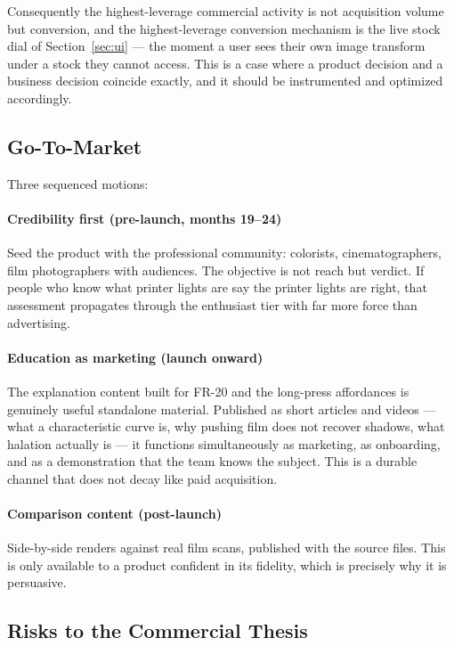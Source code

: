Consequently the highest-leverage commercial activity is not acquisition volume
but conversion, and the highest-leverage conversion mechanism is the live stock
dial of Section~\ref{sec:ui} --- the moment a user sees their own image
transform under a stock they cannot access. This is a case where a product
decision and a business decision coincide exactly, and it should be instrumented
and optimized accordingly.

\subsection{Go-To-Market}

Three sequenced motions:

\paragraph{Credibility first (pre-launch, months 19--24)} Seed the product with
the professional community: colorists, cinematographers, film photographers with
audiences. The objective is not reach but verdict. If people who know what
printer lights are say the printer lights are right, that assessment propagates
through the enthusiast tier with far more force than advertising.

\paragraph{Education as marketing (launch onward)} The explanation content built
for FR-20 and the long-press affordances is genuinely useful standalone material.
Published as short articles and videos --- what a characteristic curve is, why
pushing film does not recover shadows, what halation actually is --- it
functions simultaneously as marketing, as onboarding, and as a demonstration
that the team knows the subject. This is a durable channel that does not decay
like paid acquisition.

\paragraph{Comparison content (post-launch)} Side-by-side renders against real
film scans, published with the source files. This is only available to a product
confident in its fidelity, which is precisely why it is persuasive.

\subsection{Risks to the Commercial Thesis}


